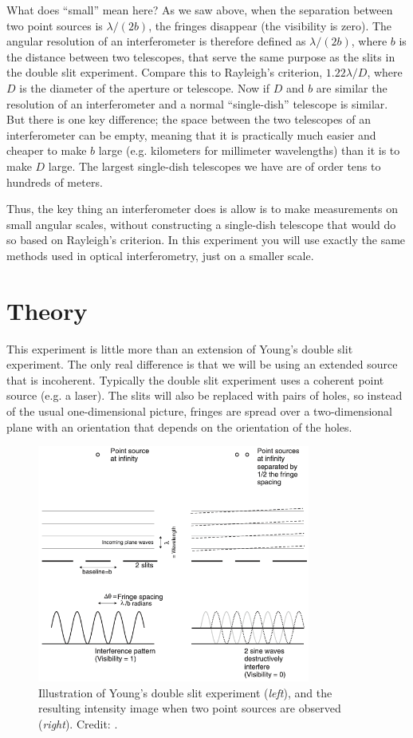 \documentclass[11pt]{article}
\begin{document}
What does ``small'' mean here? As we saw above, when the separation between two point sources is $\lambda/(2b)$, the fringes disappear (the visibility is zero). The angular resolution of an interferometer is therefore defined as $\lambda/(2b)$, where $b$ is the distance between two telescopes, that serve the same purpose as the slits in the double slit experiment. Compare this to Rayleigh's criterion, $1.22 \lambda/D$, where $D$ is the diameter of the aperture or telescope. Now if $D$ and $b$ are similar the resolution of an interferometer and a normal ``single-dish'' telescope is similar. But there is one key difference; the space between the two telescopes of an interferometer can be empty, meaning that it is practically much easier and cheaper to make $b$ large (e.g. kilometers for millimeter wavelengths) than it is to make $D$ large. The largest single-dish telescopes we have are of order tens to hundreds of meters.

Thus, the key thing an interferometer does is allow is to make measurements on small angular scales, without constructing a single-dish telescope that would do so based on Rayleigh's criterion. In this experiment you will use exactly the same methods used in optical interferometry, just on a smaller scale.

\clearpage
\section{Theory}

This experiment is little more than an extension of Young's double slit experiment. The only real difference is that we will be using an extended source that is incoherent. Typically the double slit experiment uses a coherent point source (e.g. a laser). The slits will also be replaced with pairs of holes, so instead of the usual one-dimensional picture, fringes are spread over a two-dimensional plane with an orientation that depends on the orientation of the holes. 

\begin{figure}[h]
    \centering
    \includegraphics[width=0.8\textwidth]{doc/youngs.png}
    \caption{Illustration of Young's double slit experiment (\emph{left}), and the resulting intensity image when two point sources are observed (\emph{right}). Credit: \citet{2003RPPh...66..789M}.}
    \label{fig:youngs}
\end{figure}
\end{document}
